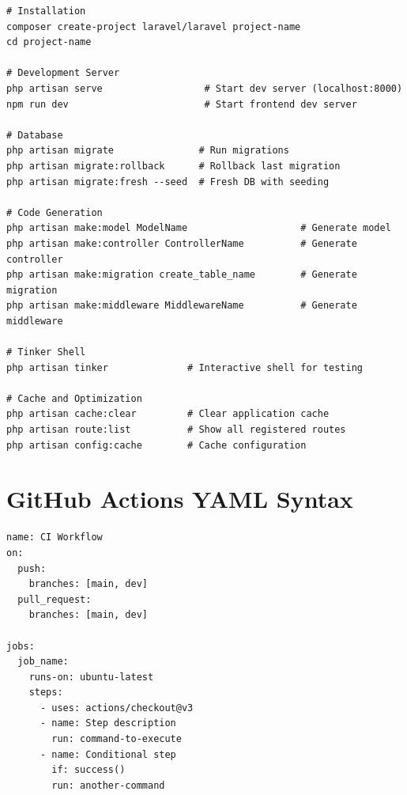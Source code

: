 \documentclass[a4paper,oneside,11pt]{book}
\begin{document}
\begin{lstlisting}[style=jsStyle, caption={Essential Laravel Commands}, label={kode:laravelcommands}]
# Installation
composer create-project laravel/laravel project-name
cd project-name

# Development Server
php artisan serve                  # Start dev server (localhost:8000)
npm run dev                        # Start frontend dev server

# Database
php artisan migrate               # Run migrations
php artisan migrate:rollback      # Rollback last migration
php artisan migrate:fresh --seed  # Fresh DB with seeding

# Code Generation
php artisan make:model ModelName                    # Generate model
php artisan make:controller ControllerName          # Generate controller
php artisan make:migration create_table_name        # Generate migration
php artisan make:middleware MiddlewareName          # Generate middleware

# Tinker Shell
php artisan tinker              # Interactive shell for testing

# Cache and Optimization
php artisan cache:clear         # Clear application cache
php artisan route:list          # Show all registered routes
php artisan config:cache        # Cache configuration
\end{lstlisting}

\section{GitHub Actions YAML Syntax}

\begin{lstlisting}[style=yamlStyle, caption={GitHub Actions Workflow Syntax}, label={kode:actionsyntax}]
name: CI Workflow
on:
  push:
    branches: [main, dev]
  pull_request:
    branches: [main, dev]

jobs:
  job_name:
    runs-on: ubuntu-latest
    steps:
      - uses: actions/checkout@v3
      - name: Step description
        run: command-to-execute
      - name: Conditional step
        if: success()
        run: another-command
\end{lstlisting}
\end{document}
